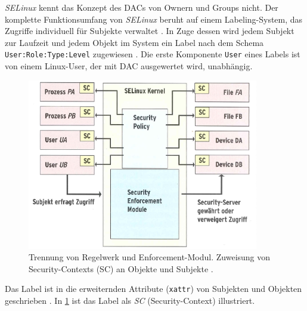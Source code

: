 \documentclass[../main.tex]{subfiles}
\begin{document}
				\emph{SELinux} kennt das Konzept des DACs von Ownern und Groups nicht. Der komplette Funktionsumfang von \emph{SELinux} beruht auf einem Labeling-System, das Zugriffe individuell für Subjekte verwaltet \cite{SELinuxComic}. In Zuge dessen wird jedem Subjekt zur Laufzeit und jedem Objekt im System ein Label nach dem Schema \texttt{User:Role:Type:Level} zugewiesen \cite{atomicDockerSELinux}. Die erste Komponente \texttt{User} eines Labels ist von einem Linux-User, der mit \acrshort{DAC} ausgewertet wird, unabhängig.

				\begin{figure}[h]
						\centering
						\includegraphics[width=0.9\textwidth]{./images/sec_SELinux.jpg}
						\caption{Trennung von Regelwerk und Enforcement-Modul. Zuweisung von Security-Contexts (SC) an Objekte und Subjekte \cite[S.63]{linuxMagazineSec}.}
						\label{fig:sec_SELinux}
				\end{figure}

				Das Label ist in die erweiternden Attribute (\texttt{xattr}) von Subjekten und Objekten geschrieben \cite[S.65]{linuxMagazineSec}. In \fig \ref{fig:sec_SELinux} ist das Label als \emph{SC} (Security-Context) illustriert.

\end{document}
